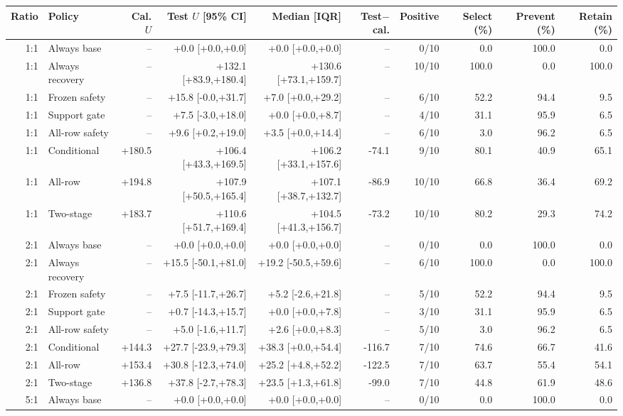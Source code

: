 \begin{tabular}{rlrrrrrrrr}
\toprule
Ratio & Policy & Cal. $U$ & Test $U$ [95\% CI] & Median [IQR] & Test$-$cal. & Positive & Select (\%) & Prevent (\%) & Retain (\%) \\
\midrule
1:1 & Always base & -- & +0.0 [+0.0,+0.0] & +0.0 [+0.0,+0.0] & -- & 0/10 & 0.0 & 100.0 & 0.0 \\
1:1 & Always recovery & -- & +132.1 [+83.9,+180.4] & +130.6 [+73.1,+159.7] & -- & 10/10 & 100.0 & 0.0 & 100.0 \\
1:1 & Frozen safety & -- & +15.8 [-0.0,+31.7] & +7.0 [+0.0,+29.2] & -- & 6/10 & 52.2 & 94.4 & 9.5 \\
1:1 & Support gate & -- & +7.5 [-3.0,+18.0] & +0.0 [+0.0,+8.7] & -- & 4/10 & 31.1 & 95.9 & 6.5 \\
1:1 & All-row safety & -- & +9.6 [+0.2,+19.0] & +3.5 [+0.0,+14.4] & -- & 6/10 & 3.0 & 96.2 & 6.5 \\
1:1 & Conditional & +180.5 & +106.4 [+43.3,+169.5] & +106.2 [+33.1,+157.6] & -74.1 & 9/10 & 80.1 & 40.9 & 65.1 \\
1:1 & All-row & +194.8 & +107.9 [+50.5,+165.4] & +107.1 [+38.7,+132.7] & -86.9 & 10/10 & 66.8 & 36.4 & 69.2 \\
1:1 & Two-stage & +183.7 & +110.6 [+51.7,+169.4] & +104.5 [+41.3,+156.7] & -73.2 & 10/10 & 80.2 & 29.3 & 74.2 \\
2:1 & Always base & -- & +0.0 [+0.0,+0.0] & +0.0 [+0.0,+0.0] & -- & 0/10 & 0.0 & 100.0 & 0.0 \\
2:1 & Always recovery & -- & +15.5 [-50.1,+81.0] & +19.2 [-50.5,+59.6] & -- & 6/10 & 100.0 & 0.0 & 100.0 \\
2:1 & Frozen safety & -- & +7.5 [-11.7,+26.7] & +5.2 [-2.6,+21.8] & -- & 5/10 & 52.2 & 94.4 & 9.5 \\
2:1 & Support gate & -- & +0.7 [-14.3,+15.7] & +0.0 [+0.0,+7.8] & -- & 3/10 & 31.1 & 95.9 & 6.5 \\
2:1 & All-row safety & -- & +5.0 [-1.6,+11.7] & +2.6 [+0.0,+8.3] & -- & 5/10 & 3.0 & 96.2 & 6.5 \\
2:1 & Conditional & +144.3 & +27.7 [-23.9,+79.3] & +38.3 [+0.0,+54.4] & -116.7 & 7/10 & 74.6 & 66.7 & 41.6 \\
2:1 & All-row & +153.4 & +30.8 [-12.3,+74.0] & +25.2 [+4.8,+52.2] & -122.5 & 7/10 & 63.7 & 55.4 & 54.1 \\
2:1 & Two-stage & +136.8 & +37.8 [-2.7,+78.3] & +23.5 [+1.3,+61.8] & -99.0 & 7/10 & 44.8 & 61.9 & 48.6 \\
5:1 & Always base & -- & +0.0 [+0.0,+0.0] & +0.0 [+0.0,+0.0] & -- & 0/10 & 0.0 & 100.0 & 0.0 \\

\end{tabular}
